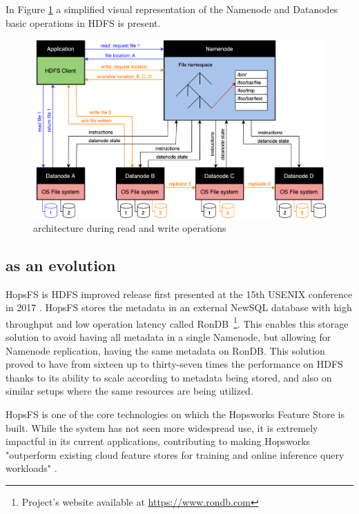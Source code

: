 In Figure \ref{fig:hdfs} a simplified visual representation of the Namenode and Datanodes basic operations in \gls{HDFS} is present.

\begin{figure}[!ht]
    \begin{center}
      \includegraphics[width=\textwidth]{figures/2-background/HDFS.png}
    \end{center}
    \caption{ architecture during read and write operations}
    \label{fig:hdfs}
\end{figure}
 
\subsection{ as an  evolution}

\gls{HopsFS} is \gls{HDFS} improved release first presented at the 15th USENIX conference in 2017 \cite{niaziHopsFSScalingHierarchical2017}. \gls{HopsFS} stores the metadata in an external NewSQL database with high throughput and low operation latency called RonDB~\footnote{Project's website available at \url{https://www.rondb.com}}. This enables this storage solution to avoid having all metadata in a single Namenode, but allowing for Namenode replication, having the same metadata on RonDB. This solution proved to have from sixteen up to thirty-seven times the performance on \gls{HDFS} thanks to its ability to scale according to metadata being stored, and also on similar setups where the same resources are being utilized. 

\gls{HopsFS} is one of the core technologies on which the Hopsworks Feature Store is built. While the system has not seen more widespread use, it is extremely impactful in its current applications, contributing to making Hopsworks "outperform existing cloud feature stores for training and online inference query workloads" \cite{10.1145/3626246.3653389}. 

